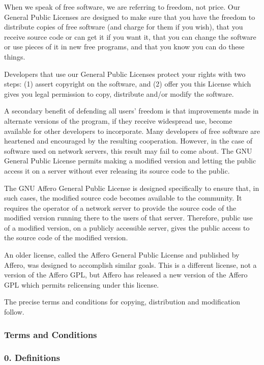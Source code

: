 \documentclass[a4paper, 11pt, twoside]{article}
\begin{document}
When we speak of free software, we are referring to freedom, not price. Our General Public Licenses are designed to make sure that you have the freedom to distribute copies of free software (and charge for them if you wish), that you receive source code or can get it if you want it, that you can change the software or use pieces of it in new free programs, and that you know you can do these things.

Developers that use our General Public Licenses protect your rights with two steps: (1) assert copyright on the software, and (2) offer you this License which gives you legal permission to copy, distribute and/or modify the software.

A secondary benefit of defending all users' freedom is that improvements made in alternate versions of the program, if they receive widespread use, become available for other developers to incorporate. Many developers of free software are heartened and encouraged by the resulting cooperation. However, in the case of software used on network servers, this result may fail to come about. The GNU General Public License permits making a modified version and letting the public access it on a server without ever releasing its source code to the public.

The GNU Affero General Public License is designed specifically to ensure that, in such cases, the modified source code becomes available to the community. It requires the operator of a network server to provide the source code of the modified version running there to the users of that server. Therefore, public use of a modified version, on a publicly accessible server, gives the public access to the source code of the modified version.

An older license, called the Affero General Public License and published by Affero, was designed to accomplish similar goals. This is a different license, not a version of the Affero GPL, but Affero has released a new version of the Affero GPL which permits relicensing under this license.

The precise terms and conditions for copying, distribution and modification follow.

\subsubsection{Terms and Conditions}

\subsubsection{0. Definitions}
\end{document}
